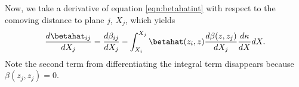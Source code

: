Now, we take a derivative of equation \ref{eqn:betahatint} with respect to the comoving distance to plane $j$, $X_j$, which yields
\begin{equation}
\label{eqn:dbetahat}
\frac{d \betahat_{i j}}{d X_j} = \frac{d\beta_{i j}}{d X_j} - \int_{X_i}^{X_j} \betahat(z_i, z) \frac{d \beta(z, z_j)}{d X_j} \frac{d \kappa}{d X} d X.
\end{equation}
Note the second term from differentiating the integral term disappears because $\beta(z_j, z_j) = 0$. 
  
  
  
  
  